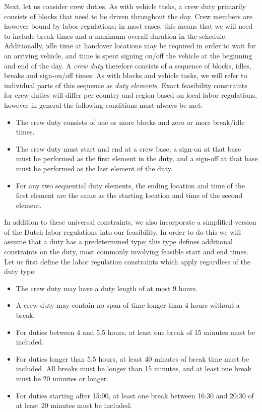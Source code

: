 \documentclass[]{article}
\begin{document}
Next, let us consider crew duties. As with vehicle tasks, a crew duty primarily consists of blocks that need to be driven throughout the day. Crew members are however bound by labor regulations; in most cases, this means that we will need to include break times and a maximum overall duration in the schedule. Additionally, idle time at handover locations may be required in order to wait for an arriving vehicle, and time is spent signing on/off the vehicle at the beginning and end of the day. A \textit{crew duty} therefore consists of a sequence of blocks, idles, breaks and sign-on/off times. As with blocks and vehicle tasks, we will refer to individual parts of this sequence as \emph{duty elements}. Exact feasibility constraints for crew duties will differ per country and region based on local labor regulations, however in general the following conditions must always be met: 
\begin{itemize}
  \item The crew duty consists of one or more blocks and zero or more break/idle times.
  \item The crew duty must start and end at a crew base; a sign-on at that base must be performed as the first element in the duty, and a sign-off at that base must be performed as the last element of the duty.
  \item For any two sequential duty elements, the ending location and time of the first element are the same as the starting location and time of the second element.
\end{itemize}
In addition to these universal constraints, we also incorporate a simplified version of the Dutch labor regulations into our feasibility. In order to do this we will assume that a duty has a predetermined type; this type defines additional constraints on the duty, most commonly involving feasible start and end times. Let us first define the labor regulation constraints which apply regardless of the duty type:
\begin{itemize}
  \item The crew duty may have a duty length of at most 9 hours. 
  \item A crew duty may contain no span of time longer than 4 hours without a break.
  \item For duties between 4 and 5.5 hours, at least one break of 15 minutes must be included. 
  \item For duties longer than 5.5 hours, at least 40 minutes of break time must be included. All breaks must be longer than 15 minutes, and at least one break must be 20 minutes or longer.
  \item For duties starting after 15:00, at least one break between 16:30 and 20:30 of at least 20 minutes must be included. 
\end{itemize}
\end{document}

